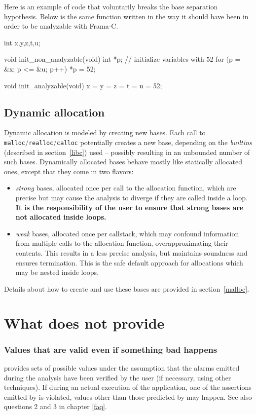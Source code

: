 \documentclass{frama-c-book}
\begin{document}
Here is an example of code that voluntarily breaks the base separation
hypothesis. Below is the same function written in the way it should
have been in order to be analyzable with Frama-C.
\begin{listing}{1}
int x,y,z,t,u;

void init_non_analyzable(void)
{
  int *p;
  // initialize variables with 52
  for (p = &x; p <= &u; p++)
    *p = 52;
}

void init_analyzable(void)
{
  x = y = z = t = u = 52;
}
\end{listing}

\subsection{Dynamic allocation}
\label{dyn-alloc}

Dynamic allocation is modeled by creating new bases.
Each call to \lstinline|malloc|/\lstinline|realloc|/\lstinline|calloc|
potentially creates a
new base, depending on the \emph{builtins} (described in section~\ref{libc})
used -- possibly resulting in an unbounded number of such bases.
Dynamically allocated bases behave mostly like statically allocated ones,
except that they come in two flavors:
%
\begin{itemize}
\item \emph{strong} bases, allocated once per call to the allocation function,
  which are precise but may cause the analysis to diverge if they are called
  inside a loop. \textbf{It is the responsibility of the user to ensure that
  strong bases are not allocated inside loops.}
\item \emph{weak} bases, allocated once per callstack, which may confound
  information from multiple calls to the allocation function, overapproximating
  their contents. This results in a less precise analysis,
  but maintains soundness and ensures termination.
  This is the safe default approach for allocations which may be nested inside
  loops.
\end{itemize}

Details about how to create and use these bases are provided in
section~\ref{malloc}.

\section{What \Eva{} does not provide}

\subsubsection{Values that are valid even if something bad happens}
\Eva{} provides sets of possible values under the
assumption that the alarms emitted during the analysis have been
verified by the user (if necessary, using other techniques).
If during an actual execution of the application,
one of the assertions emitted by \Eva{} is violated,
values other than those predicted by \Eva{} may happen.
See also questions 2 and 3 in chapter \ref{faq}.
\end{document}
